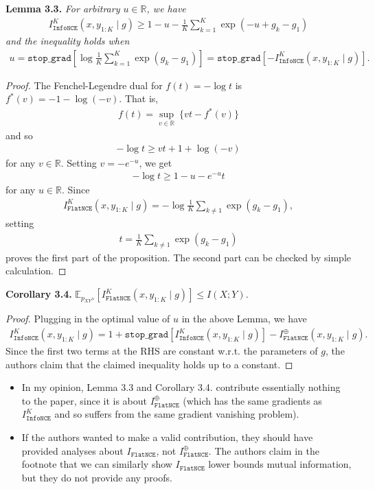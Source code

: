 \documentclass[10pt]{article}
\newcommand{\RR}{\mathbb{R}}
\newcommand{\EE}{\mathbb{E}}
\newcommand{\infonce}{\texttt{InfoNCE}}
\newcommand{\flatnce}{\texttt{FlatNCE}}
\newcommand{\stopg}{\texttt{stop\char`_grad}}
\begin{document}
\textbf{Lemma 3.3.} \textit{For arbitrary $u \in \RR$, we have}
\begin{align*}
I^K_\infonce(x,y_{1:K} \mid g) \geq 1 - u - \frac{1}{K} \sum_{k = 1}^K \exp(-u + g_k - g_1)
\end{align*}
\textit{and the inequality holds when}
\begin{align*}
u = \stopg \left[ \log \frac{1}{K} \sum_{k = 1}^K \exp(g_k - g_1) \right] = \stopg \left[ -I^K_\infonce(x,y_{1:K} \mid g) \right].
\end{align*}
\begin{proof}
The Fenchel-Legendre dual for $f(t) = - \log t$ is $f^*(v) = -1 - \log(-v)$. That is,
\begin{align*}
f(t) = \sup_{v \in \RR} \ \{vt - f^*(v)\}
\end{align*}
and so
\begin{align*}
- \log t \geq vt + 1 + \log(-v)
\end{align*}
for any $v \in \RR$. Setting $v = -e^{-u}$, we get
\begin{align*}
- \log t \geq 1 - u - e^{-u} t
\end{align*}
for any $u \in \RR$. Since
\begin{align*}
I^K_\flatnce(x,y_{1:K} \mid g) = - \log \frac{1}{K} \sum_{k \neq 1} \exp(g_k - g_1),
\end{align*}
setting
\begin{align*}
t = \frac{1}{K} \sum_{k \neq 1} \exp(g_k - g_1)
\end{align*}
proves the first part of the proposition. The second part can be checked by simple calculation.
\end{proof}

\textbf{Corollary 3.4.} $\EE_{p_{XY^N}} \left[ I^K_\flatnce(x,y_{1:K} \mid g) \right] \leq I(X;Y)$.
\begin{proof}
Plugging in the optimal value of $u$ in the above Lemma, we have
\begin{align*}
I^K_\infonce(x,y_{1:K} \mid g) = 1 + \stopg \left[ I^K_\infonce(x,y_{1:K} \mid g) \right] - I^\oplus_\flatnce(x,y_{1:K} \mid g).
\end{align*}
Since the first two terms at the RHS are constant w.r.t. the parameters of $g$, the authors claim that the claimed inequality holds up to a constant.
\end{proof}

\begin{itemize}
\item In my opinion, Lemma 3.3 and Corollary 3.4. contribute essentially nothing to the paper, since it is about $I^\oplus_\flatnce$ (which has the same gradients as $I^K_\infonce$ and so suffers from the same gradient vanishing problem).
\item If the authors wanted to make a valid contribution, they should have provided analyses about $I_\flatnce$, not $I^\oplus_\flatnce$. The authors claim in the footnote that we can similarly show $I_\flatnce$ lower bounds mutual information, but they do not provide any proofs.
\end{itemize}
\end{document}
